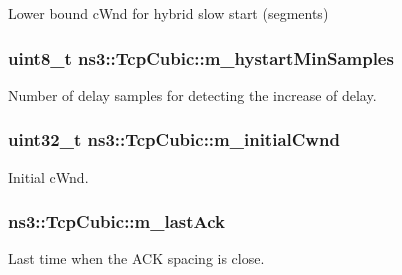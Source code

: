 Lower bound c\+Wnd for hybrid slow start (segments) 

\subsubsection[{\texorpdfstring{m\+\_\+hystart\+Min\+Samples}{m_hystartMinSamples}}]{\setlength{\rightskip}{0pt plus 5cm}uint8\+\_\+t ns3\+::\+Tcp\+Cubic\+::m\+\_\+hystart\+Min\+Samples\hspace{0.3cm}{\ttfamily [private]}}\hypertarget{classns3_1_1TcpCubic_ae86cb481bd166effae7227e90e9bafbb}{}\label{classns3_1_1TcpCubic_ae86cb481bd166effae7227e90e9bafbb}


Number of delay samples for detecting the increase of delay. 

\subsubsection[{\texorpdfstring{m\+\_\+initial\+Cwnd}{m_initialCwnd}}]{\setlength{\rightskip}{0pt plus 5cm}uint32\+\_\+t ns3\+::\+Tcp\+Cubic\+::m\+\_\+initial\+Cwnd\hspace{0.3cm}{\ttfamily [private]}}\hypertarget{classns3_1_1TcpCubic_adfc5ffb73bcdeb85814048a2adf01c1e}{}\label{classns3_1_1TcpCubic_adfc5ffb73bcdeb85814048a2adf01c1e}


Initial c\+Wnd. 

\subsubsection[{\texorpdfstring{m\+\_\+last\+Ack}{m_lastAck}}]{ ns3\+::\+Tcp\+Cubic\+::m\+\_\+last\+Ack\hspace{0.3cm}{\ttfamily [private]}}\hypertarget{classns3_1_1TcpCubic_a735cbf51912a83d6c1a75d07879ce69e}{}\label{classns3_1_1TcpCubic_a735cbf51912a83d6c1a75d07879ce69e}


Last time when the A\+CK spacing is close. 

